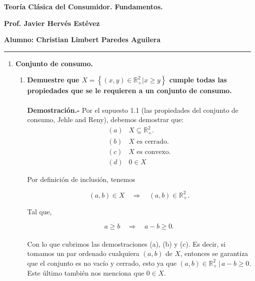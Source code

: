 \begin{center}
    \textbf{Teoría Clásica del Consumidor. Fundamentos.}
\end{center}

\begin{center}
\textbf{Prof. Javier Hervés Estévez}
\end{center}

\begin{center}
\textbf{Alumno: Christian Limbert Paredes Aguilera}
\end{center}

\begin{center}
	\rule{0.5\textwidth}{0.4pt}
\end{center}
\vspace{1cm}

\begin{enumerate}[\bfseries I.]

    \item \textbf{Conjunto de consumo.}\;\\

	\begin{enumerate}[\bfseries 1.]

	    \item \textbf{\boldmath Demuestre que $X=\left\{(x,y)\in \mathbb{R}^2_+|x\geq y\right\}$ cumple todas las propiedades que se le requieren a un conjunto de consumo.\\\\
		Demostración.-}\; Por el supuesto 1.1 (las propiedades del conjunto de consumo, Jehle and Reny), debemos demostrar que:
		$$
		\begin{array}{cl}
		    (a) & X \subseteq \mathbb{R}^2_+.\\
		    (b) & X \mbox{ es cerrado.}\\
		    (c) & X \mbox{ es convexo.}\\
		    (d) & 0 \in X
		\end{array}
		$$

		Por definición de inclusión, tenemos

		$$(a,b)\in X \quad \Rightarrow \quad (a,b)\in \mathbb{R}^2_+.$$

		Tal que, 

		$$a\geq b \quad \Rightarrow \quad a-b\geq 0.$$\\
		Con lo que cubrimos las demostraciones (a), (b) y (c). Es decir, si tomamos un par ordenado cualquiera $(a,b)$ de $X$, entonces se garantiza que el conjunto es no vacío y cerrado, esto ya que $(a,b)\in\mathbb{R}_+^2\, |\, a-b\geq 0$. Este último también nos menciona que $0\in X$.\\


\end{enumerate}
\end{enumerate}
